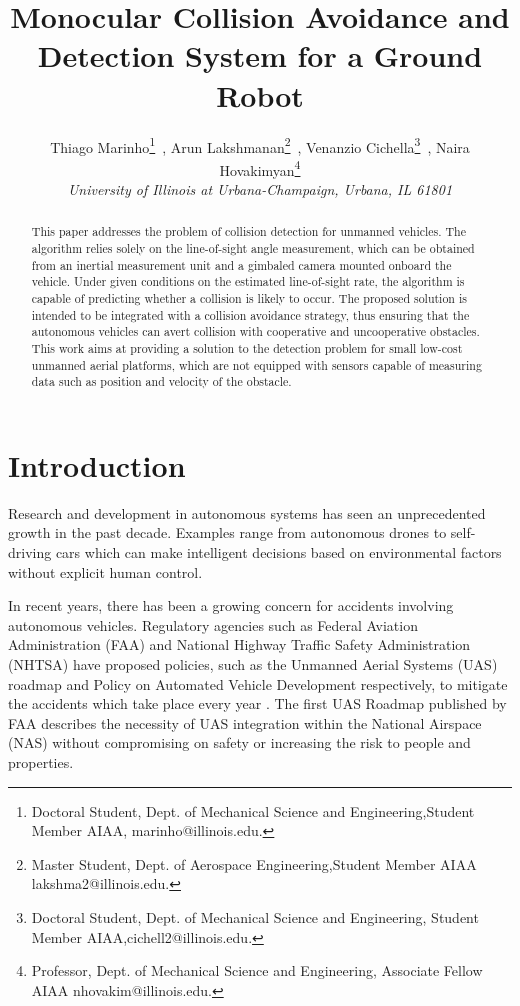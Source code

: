 \documentclass[]{aiaa-tc}%
\title{Monocular Collision Avoidance and Detection System for a Ground Robot}
\author{
   Thiago Marinho\thanks{Doctoral Student, Dept. of Mechanical Science and Engineering,Student Member AIAA, marinho@illinois.edu.}~,
   Arun Lakshmanan\thanks{Master Student, Dept. of Aerospace Engineering,Student Member AIAA lakshma2@illinois.edu.}~,
    Venanzio Cichella\thanks{Doctoral Student, Dept. of Mechanical Science and Engineering, Student Member AIAA,cichell2@illinois.edu.}~,
    Naira Hovakimyan\thanks{Professor, Dept. of Mechanical Science and Engineering, Associate Fellow AIAA
    nhovakim@illinois.edu.}\\
    {\normalsize\itshape University of Illinois at Urbana-Champaign, Urbana, IL 61801}
}
\begin{document}
\maketitle

\begin{abstract}

This paper addresses the problem of collision detection for unmanned vehicles. The algorithm relies solely on the line-of-sight angle measurement, which can be obtained from an inertial measurement unit and a gimbaled camera mounted onboard the vehicle. Under given conditions on the estimated line-of-sight rate, the algorithm is capable of predicting whether a collision is likely to occur. The proposed solution is intended to be integrated with a collision avoidance strategy, thus ensuring that the autonomous vehicles can avert collision with cooperative and uncooperative obstacles. This work aims at providing a solution to the detection problem for small low-cost unmanned aerial platforms, which are not equipped with sensors capable of measuring data such as position and velocity of the obstacle.
\end{abstract}



\section{Introduction}
\label{sec:Introduction}
Research and development in autonomous systems  has seen an unprecedented growth in the past decade. Examples range from autonomous drones to self-driving cars which can make intelligent decisions based on environmental factors without explicit human control.

In recent years, there has been a growing concern for accidents involving autonomous vehicles. Regulatory agencies such as Federal Aviation Administration (FAA) and National Highway Traffic Safety Administration (NHTSA) have proposed policies, such as the Unmanned Aerial Systems (UAS) roadmap \cite{FAA_UAS} and Policy on Automated Vehicle Development \cite{autodev2014} respectively, to mitigate the accidents which take place every year \cite{FAAaccd2010}. The first UAS Roadmap published by FAA describes the necessity of UAS integration within the National Airspace (NAS) without compromising on safety or increasing the risk to people and properties.
\end{document}
